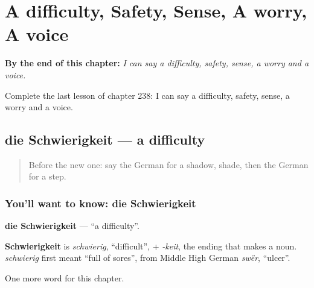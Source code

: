 
\chapter{A difficulty, Safety, Sense, A worry, A voice}
\label{ch:ge-a-difficulty-safety-sense-a-worry-a-voice}

\begin{chapteropening}
\textbf{By the end of this chapter:} \emph{I can say a difficulty, safety, sense, a worry and a voice.}

Complete the last lesson of chapter 238: I can say a difficulty, safety, sense, a worry and a voice.
\end{chapteropening}

\section[die Schwierigkeit]{die Schwierigkeit — a difficulty}

\label{lesson:GE-C238-schwierigkeit}



\begin{quote}
Before the new one: say the German for a shadow, shade, then the German for a step.
\end{quote}

\subsection*{You'll want to know: die Schwierigkeit}
\textbf{die Schwierigkeit} — \textquotedblleft{}a difficulty\textquotedblright{}.

\begin{cousinweb}
\textbf{Schwierigkeit} is \emph{schwierig}, \textquotedblleft{}difficult\textquotedblright{}, + \emph{-keit}, the ending that makes a noun. \emph{schwierig} first meant \textquotedblleft{}full of sores\textquotedblright{}, from Middle High German \emph{swër}, \textquotedblleft{}ulcer\textquotedblright{}.
\end{cousinweb}

\begin{grammarlens}[title={What you've built}]
One more word for this chapter.
\end{grammarlens}

